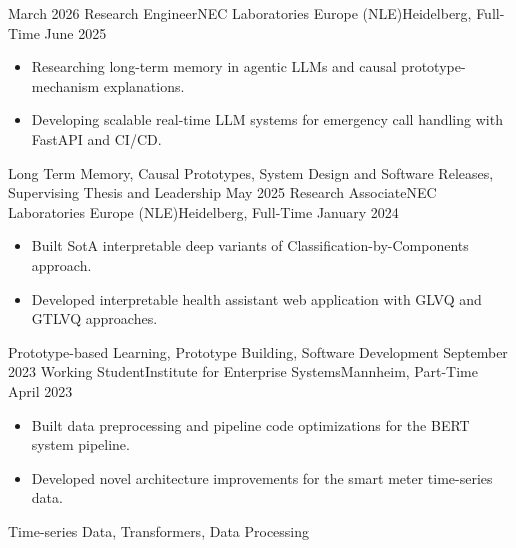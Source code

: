 


\begin{experiences}
  \experience
    {March 2026} {Research Engineer}{NEC Laboratories Europe (NLE)}{Heidelberg, Full-Time}
    {June 2025}    {
                      \begin{itemize}
                        \item{Researching long-term memory in agentic LLMs and causal prototype-mechanism explanations.}
                        \item {Developing scalable real-time LLM systems for emergency call handling with FastAPI and CI/CD.}
                      \end{itemize}
                    }
                    {Long Term Memory, Causal Prototypes, System Design and Software Releases, Supervising Thesis and Leadership}
  \emptySeparator
  \experience
    {May 2025} {Research Associate}{NEC Laboratories Europe (NLE)}{Heidelberg, Full-Time}
    {January 2024}    {
                      \begin{itemize}
                        \item{Built SotA interpretable deep variants of Classification-by-Components approach.}
                        \item {Developed interpretable health assistant web application with GLVQ and GTLVQ approaches.}
                      \end{itemize}
                    }
                    {Prototype-based Learning, Prototype Building, Software Development}
  \emptySeparator
  \experience
    {September 2023} {Working Student}{Institute for Enterprise Systems}{Mannheim, Part-Time}
    {April 2023}    {
                      \begin{itemize}
                        \item{Built data preprocessing and pipeline code optimizations for the BERT system pipeline.}
                        \item {Developed novel architecture improvements for the smart meter time-series data.}
                      \end{itemize}
                    }
                    {Time-series Data, Transformers, Data Processing}
  \emptySeparator
  

\end{experiences}
